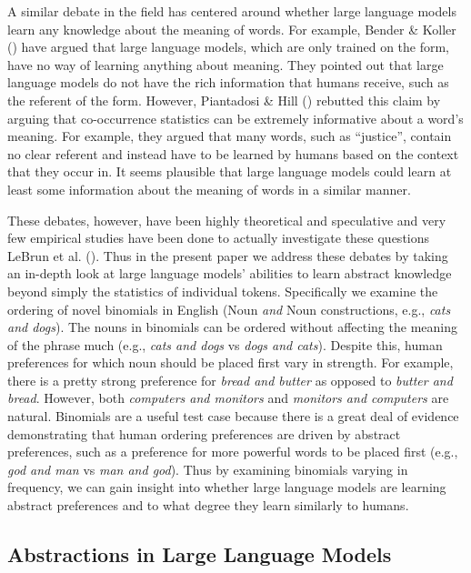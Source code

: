 \documentclass[
  12pt,
  letterpaper,
]{scrreprt}
\begin{document}
A similar debate in the field has centered around whether large language
models learn any knowledge about the meaning of words. For example,
Bender \& Koller ()
have argued that large language models, which are only trained on the
form, have no way of learning anything about meaning. They pointed out
that large language models do not have the rich information that humans
receive, such as the referent of the form. However, Piantadosi \& Hill
() rebutted this
claim by arguing that co-occurrence statistics can be extremely
informative about a word's meaning. For example, they argued that many
words, such as ``justice'', contain no clear referent and instead have
to be learned by humans based on the context that they occur in. It
seems plausible that large language models could learn at least some
information about the meaning of words in a similar manner.

These debates, however, have been highly theoretical and speculative and
very few empirical studies have been done to actually investigate these
questions LeBrun et al.
().
Thus in the present paper we address these debates by taking an in-depth
look at large language models' abilities to learn abstract knowledge
beyond simply the statistics of individual tokens. Specifically we
examine the ordering of novel binomials in English (Noun \emph{and} Noun
constructions, e.g., \emph{cats and dogs}). The nouns in binomials can
be ordered without affecting the meaning of the phrase much (e.g.,
\emph{cats and dogs} vs \emph{dogs and cats}). Despite this, human
preferences for which noun should be placed first vary in strength. For
example, there is a pretty strong preference for \emph{bread and butter}
as opposed to \emph{butter and bread}. However, both \emph{computers and
monitors} and \emph{monitors and computers} are natural. Binomials are a
useful test case because there is a great deal of evidence demonstrating
that human ordering preferences are driven by abstract preferences, such
as a preference for more powerful words to be placed first (e.g.,
\emph{god and man} vs \emph{man and god}). Thus by examining binomials
varying in frequency, we can gain insight into whether large language
models are learning abstract preferences and to what degree they learn
similarly to humans.

\subsection{Abstractions in Large Language
Models}\label{abstractions-in-large-language-models}
\end{document}
